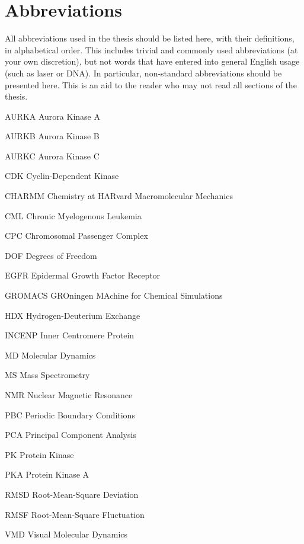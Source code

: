 \chapter*{Abbreviations}
\thispagestyle{plain}

All abbreviations used in the thesis should be listed here, with their definitions, in alphabetical order.  This includes trivial and commonly used abbreviations (at your own discretion), but not words that have entered into general English usage (such as laser or DNA).  In particular, non-standard abbreviations should be presented here.  This is an aid to the reader who may not read all sections of the thesis. \\ %

\begin{abbreviations}
    \item[AURKA] Aurora Kinase A
    \item[AURKB] Aurora Kinase B
    \item[AURKC] Aurora Kinase C
    \item[CDK] Cyclin-Dependent Kinase
    \item[CHARMM] Chemistry at HARvard Macromolecular Mechanics
    \item[CML] Chronic Myelogenous Leukemia 
    \item[CPC] Chromosomal Passenger Complex
    \item[DOF] Degrees of Freedom
    \item[EGFR] Epidermal Growth Factor Receptor
    \item[GROMACS] GROningen MAchine for Chemical Simulations
    \item[HDX] Hydrogen-Deuterium Exchange
    \item[INCENP] Inner Centromere Protein
    \item[MD] Molecular Dynamics
    \item[MS] Mass Spectrometry
    \item[NMR] Nuclear Magnetic Resonance
    \item[PBC] Periodic Boundary Conditions
    \item[PCA] Principal Component Analysis
    \item[PK] Protein Kinase
    \item[PKA] Protein Kinase A
    \item[RMSD] Root-Mean-Square Deviation
    \item[RMSF] Root-Mean-Square Fluctuation
    \item[VMD] Visual Molecular Dynamics
\end{abbreviations}